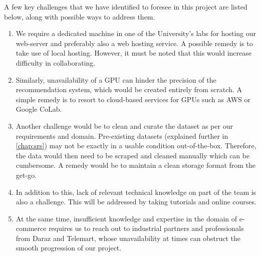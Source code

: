 A few key challenges that we have identified to foresee in this project are listed below, along with possible ways to address them.

\begin{enumerate}
	\item We require a dedicated machine in one of the University’s labs for hosting our web-server and preferably also a web hosting service. A possible remedy is to take use of local hosting. However, it must be noted that this would increase difficulty in collaborating.
	\item Similarly, unavailability of a GPU can hinder the precision of the recommendation system, which would be created entirely from scratch. A simple remedy is to resort to cloud-based services for GPUs such as AWS or Google CoLab.
	\item Another challenge would be to clean and curate the dataset as per our requirements and domain. Pre-existing datasets (explained further in \autoref{chap:srs}) may not be exactly in a usable condition out-of-the-box. Therefore, the data would then need to be scraped and cleaned manually which can be cumbersome. A remedy would be to maintain a clean storage format from the get-go.
	\item In addition to this, lack of relevant technical knowledge on part of the team is also a challenge. This will be addressed by taking tutorials and online courses.
	\item At the same time, insufficient knowledge and expertise in the domain of e-commerce requires us to reach out to industrial partners and professionals from Daraz and Telemart, whose unavailability at times can obstruct the smooth progression of our project.
\end{enumerate}